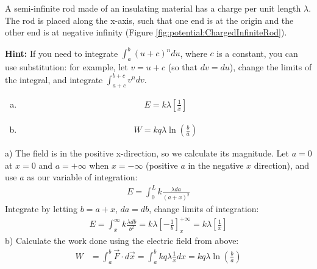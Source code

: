 \question \label{q:potential:E_field_from_rod} A semi-infinite rod made of an insulating material has a charge per unit length $\lambda$. The rod is placed along the x-axis, such that one end is at the origin and the other end is at negative infinity (Figure \ref{fig:potential:ChargedInfiniteRod}).
\textbf{Hint:} If you need to integrate $\int_a^b (u+c)^n du$, where $c$ is a constant, you can use substitution: for example, let $v = u+c$ (so that $dv=du$), change the limits of the integral, and integrate $\int_{a+c}^{b+c}v^ndv$.
\begin{finalanswer}
\begin{enumerate}[(a)]
\item \begin{align*}
E=k\lambda\left[\frac{1}{x}\right]
\end{align*}
\item \begin{align*}
W=kq\lambda\ln\left( \frac{b}{a} \right)
\end{align*}
\end{enumerate}
\end{finalanswer}
\begin{solution}
a) The field is in the positive x-direction, so we calculate its magnitude. Let $a=0$ at $x=0$ and $a=+\infty$ when $x=-\infty$ (positive $a$ in the negative $x$ direction), and use $a$ as our variable of integration:
\begin{align*}
E = \int_{0}^{L}k\frac{\lambda da}{(a+x)^2}
\end{align*}
Integrate by letting $b=a+x$, $da=db$, change limits of integration:
\begin{align*}
E = \int_{x}^{\infty}k\frac{\lambda db}{b^2}=k\lambda \left[-\frac{1}{b}\right]_{x}^{+\infty}=k\lambda\left[\frac{1}{x}\right]
\end{align*}
b) Calculate the work done using the electric field from above:
\begin{align*}
W &= \int_{a}^{b}\vec F\cdot d\vec x=\int_{a}^{b}kq\lambda\frac{1}{x} dx= kq\lambda\ln\left( \frac{b}{a} \right)
\end{align*}
\end{solution}

